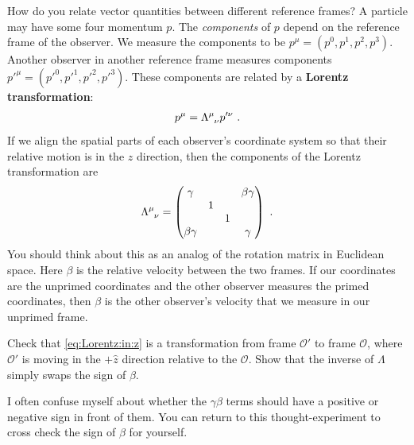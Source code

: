 How do you relate vector quantities between different reference frames? A particle may have some four momentum $p$. The \emph{components} of $p$ depend on the reference frame of the observer. We measure the components to be $p^\mu = (p^0, p^1, p^2, p^3)$. Another observer in another reference frame measures components $p'^\mu=(p'^0, p'^1, p'^2, p'^3)$. These components are related by a \textbf{Lorentz transformation}:
\begin{align}
    p^\mu = \Lambda\aij{\mu}{\nu}p'^\nu \ .
\end{align}
If we align the spatial parts of each observer's coordinate system so that their relative motion is in the $z$ direction, then the components of the Lorentz transformation are
\begin{align}
    \Lambda\aij{\mu}{\nu} =
    \begin{pmatrix}
        \gamma & & & \beta\gamma\\
        & 1 & &  \\
        & & 1 &  \\
        \beta\gamma &  &  & \gamma
    \end{pmatrix}
    \ . 
    \label{eq:Lorentz:in:z}
\end{align}
You should think about this as an analog of the rotation matrix in Euclidean space. Here $\beta$ is the relative velocity between the two frames. If our coordinates are the unprimed coordinates and the other observer measures the primed coordinates, then $\beta$ is the other observer's velocity that we measure in our unprimed frame. 
\begin{exercise}
Check that \eqref{eq:Lorentz:in:z} is a transformation from frame $\mathcal O'$
 to frame $\mathcal O$, where $\mathcal O'$ is moving in the $+\hat{z}$ direction relative to the $\mathcal O$. Show that the inverse of $\Lambda$ simply swaps the sign of $\beta$. 

I often confuse myself about whether the $\gamma \beta$ terms should have a positive or negative sign in front of them. You can return to this thought-experiment to cross check  the sign of $\beta$ for yourself.
\end{exercise}
